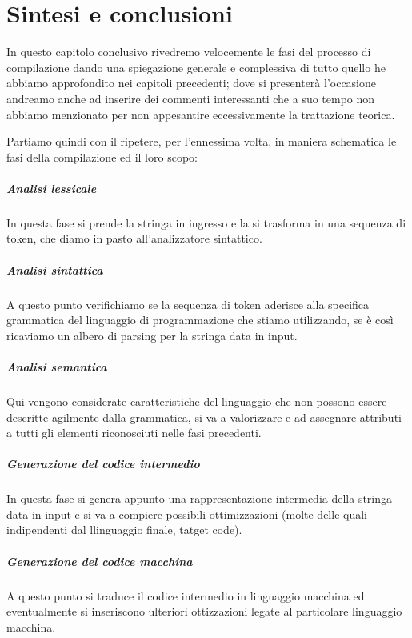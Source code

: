 \documentclass[class=book, crop=false, oneside, 12pt]{standalone}
\begin{document}
\chapter{Sintesi e conclusioni}
In questo capitolo conclusivo rivedremo velocemente le fasi del  processo di compilazione dando una spiegazione generale e complessiva di tutto quello he abbiamo approfondito nei capitoli precedenti; dove si presenterà l'occasione andreamo anche ad inserire dei commenti interessanti che a suo tempo non abbiamo menzionato per non appesantire eccessivamente la trattazione teorica.

Partiamo quindi con il ripetere, per l'ennessima volta, in maniera schematica le fasi della compilazione ed il loro scopo:
\paragraph{Analisi lessicale} In questa fase si prende la stringa in ingresso e la si trasforma in una sequenza di token, che diamo in pasto all'analizzatore sintattico.

\paragraph{Analisi sintattica} A questo punto verifichiamo se la sequenza di token aderisce alla specifica grammatica del linguaggio di programmazione che stiamo utilizzando, se è così ricaviamo un albero di parsing per la stringa data in input. 

\paragraph{Analisi semantica} Qui vengono considerate caratteristiche del linguaggio che non possono essere descritte agilmente dalla grammatica, si va a valorizzare e ad assegnare attributi a tutti gli elementi riconosciuti nelle fasi precedenti.
	
\paragraph{Generazione del codice intermedio} In questa fase si genera appunto una rappresentazione intermedia della stringa data in input e si va a compiere possibili ottimizzazioni (molte delle quali indipendenti dal llinguaggio finale, tatget code).

\paragraph{Generazione del codice macchina}	A questo punto si traduce il codice intermedio in linguaggio macchina ed eventualmente si inseriscono ulteriori ottizzazioni legate al particolare linguaggio macchina.
    
\end{document}
